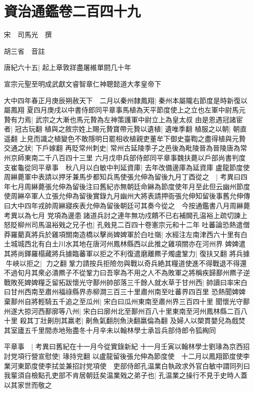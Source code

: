 \section{資治通鑑卷二百四十九}
宋　司馬光　撰

胡三省　音註

唐紀六十五|{
	起上章敦牂盡屠維單閼几十年}


宣宗元聖至明成武獻文睿智章仁神聰懿道大孝皇帝下

大中四年春正月庚辰朔赦天下　二月以秦州隸鳳翔|{
	秦州本屬隴右節度是時新復以屬鳳翔}
夏四月庚戌以中書侍郎同平章事馬植為天平節度使上之立也左軍中尉馬元贄有力焉|{
	武宗之大漸也馬元贄為左神策護軍中尉立上為皇太叔}
由是恩遇冠諸宦者|{
	冠古玩翻}
植與之敘宗姓上賜元贄寶帶元贄以遺植|{
	遺唯季翻}
植服之以朝|{
	朝直遥翻}
上見而識之植變色不敢隱明日罷相收植親吏董牟下御史臺鞫之盡得植與元贄交通之狀|{
	下戶嫁翻}
再貶常州刺史|{
	常州古延陵季子之邑後為毗陵晉為晉陵唐為常州京師東南二千八百四十三里}
六月戊申兵部侍郎同平章事魏扶薨以戶部尚書判度支崔龜從同平章事　秋八月以白敏中判延資庫|{
	去年改備邊庫為延資庫}
盧龍節度使周綝薨軍中表請以押牙兼馬步都知兵馬使張允伸為留後九月丁酉從之　|{
	考異曰四年七月周綝薨張允伸為留後注曰舊紀亦無朝廷命綝為節度使年月至此但云幽州節度使周綝卒軍人立張允伸為留後實錄九月幽州大將表請押衙張允伸知留後事舊允伸傳曰大中四年戎帥周綝寢疾表允伸為留後朝廷可其奏今從之　今按通鑑書八月周綝薨考異以為七月}
党項為邊患諸道兵討之連年無功戍饋不已右補闕孔温裕上疏切諫上怒貶柳州司馬温裕戣之兄子也|{
	孔戣見二百四十卷憲宗元和十二年}
吐蕃論恐熱遣僧莽羅藺真將兵於雞項關南造橋以擊尚婢婢軍於白吐嶺|{
	水經注左南津西六十里有白土城城西北有白土川水其地在唐河州鳳林縣西以此推之雞項關亦在河州界}
婢婢遣其將尚鐸羅榻藏將兵據臨蕃軍以拒之不利復遣磨離羆子燭盧鞏力|{
	復扶又翻}
將兵據牛峽以拒之|{
	力之翻}
鞏力請按兵拒險勿與戰以奇兵絶其糧道使進不得戰退不得還不過旬月其衆必潰羆子不從鞏力曰吾寧為不用之人不為敗軍之將稱疾歸鄯州羆子逆戰敗死婢婢糧乏留拓跋懷光守鄯州帥部落三千餘人就水草于甘州西|{
	帥讀曰率宋白曰甘州西南至肅州福祿縣界赤柳澗三百三十里肅州南至吐蕃界四百里}
恐熱聞婢婢棄鄯州自將輕騎五千追之至瓜州|{
	宋白曰瓜州東南至肅州界三百四十里}
聞懷光守鄯州遂大掠河西鄯廓等八州|{
	宋白曰廓州北至鄯州百八十里東南至河州鳳林縣二百八十里}
殺其丁壯劓刖其羸老|{
	劓魚氣翻刖魚決翻羸倫為翻}
及婦人以槊貫嬰兒為戲焚其室廬五千里間赤地殆盡冬十月辛未以翰林學士承旨兵部侍郎令狐綯同

平章事　|{
	考異曰舊紀在十一月今從實錄新紀}
十一月壬寅以翰林學士劉瑑為京西招討党項行營宣慰使|{
	瑑持兖翻}
以盧龍留後張允伸為節度使　十二月以鳳翔節度使李業河東節度使李拭並兼招討党項使　吏部侍郎孔温業白執政求外官白敏中謂同列曰我輩須自檢點孔吏部不肯居朝廷矣温業戣之弟子也|{
	孔温業之操行不見于史時人蓋以其家世而敬之}


